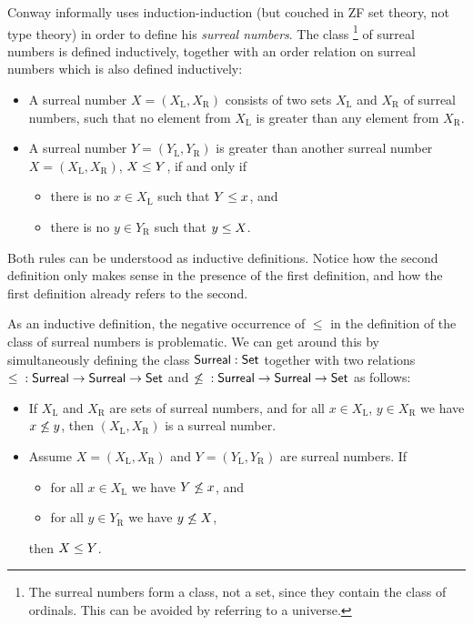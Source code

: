 \documentclass{schwicht}
\begin{document}
\begin{example}
\label{ex:surreal}

Conway \cite{conway2001ONAG} informally uses induction-induction (but
couched in ZF set theory, not type theory) in order to define his
\emph{surreal numbers}. The class \footnote{The surreal numbers form a
  class, not a set, since they contain the class of ordinals. This can
  be avoided by referring to a universe.} of surreal numbers is
defined inductively, together with an order relation on surreal
numbers which is also defined inductively:

\begin{itemize}
\item A surreal number $X = (X_\mathrm{L}, X_\mathrm{R})$ consists of
  two sets $X_\mathrm{L}$ and $X_\mathrm{R}$ of surreal numbers, such
  that no element from $X_\mathrm{L}$ is greater than any element from
  $X_\mathrm{R}$.
\item A surreal number $Y = (Y_\mathrm{L}, Y_\mathrm{R})$ is greater
  than another surreal number $X = (X_\mathrm{L}, X_\mathrm{R})$, $X \leq Y$, if and
  only if
  \begin{itemize}
  \item there is no $x \in X_\mathrm{L}$ such that $Y \leq x$, and
  \item there is no $y \in Y_\mathrm{R}$ such that $y \leq X$.
  \end{itemize}
\end{itemize}

Both rules can be understood as inductive definitions. Notice how the
second definition only makes sense in the presence of the first
definition, and how the first definition already refers to the second.

As an inductive definition, the negative occurrence of $\leq$ in the
definition of the class of surreal numbers is problematic. We can get
around this by simultaneously defining the class $\mathsf{Surreal} : \mathsf{Set}$
together with two relations $ \leq {} : \mathsf{Surreal} \to \mathsf{Surreal} \to \mathsf{Set}$ and
${ \not\leq {} : \mathsf{Surreal} \to \mathsf{Surreal} \to \mathsf{Set}}$ as follows:

\begin{itemize}
\item If $X_\mathrm{L}$ and $X_\mathrm{R}$ are sets of surreal
  numbers, and for all $x \in X_\mathrm{L}$, $y \in X_\mathrm{R}$ we
  have $x \not\leq y$, then $(X_\mathrm{L}, X_\mathrm{R})$ is a surreal number.

\item Assume $X = (X_\mathrm{L}, X_\mathrm{R})$ and $Y = (Y_\mathrm{L}, Y_\mathrm{R})$ are surreal numbers.
 If 
 \begin{itemize}
 \item for all $x \in X_\mathrm{L}$ we have $Y \not\leq x$, and
 \item for all $y \in Y_\mathrm{R}$ we have $y \not\leq X$,
 \end{itemize}
then $X \leq Y$.


\end{itemize}
\end{example}
\end{document}

